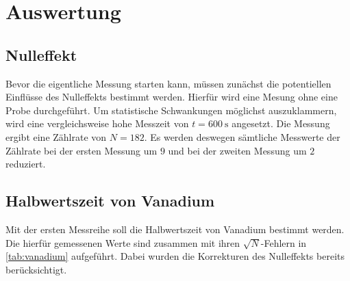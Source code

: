 \section{Auswertung}
\label{sec:Auswertung}


\subsection{Nulleffekt}
\label{sec:Nulleffekt}

Bevor die eigentliche Messung starten kann, müssen zunächst die potentiellen Einflüsse des Nulleffekts bestimmt werden. Hierfür wird eine Mesung ohne eine
Probe durchgeführt. Um statistische Schwankungen möglichst auszuklammern, wird eine vergleichsweise hohe Messzeit von $t = \SI{600}{\second}$ angesetzt.
Die Messung ergibt eine Zählrate von $N = 182$. Es werden deswegen sämtliche Messwerte der Zählrate bei der ersten Messung um $9$ und bei der zweiten
Messung um $2$ reduziert.


\subsection{Halbwertszeit von Vanadium}
\label{sec:Vanadium}

Mit der ersten Messreihe soll die Halbwertszeit von Vanadium bestimmt werden. Die hierfür gemessenen Werte sind zusammen mit ihren $\sqrt{N}$-Fehlern
in \autoref{tab:vanadium} aufgeführt. Dabei wurden die Korrekturen des Nulleffekts bereits berücksichtigt. 

